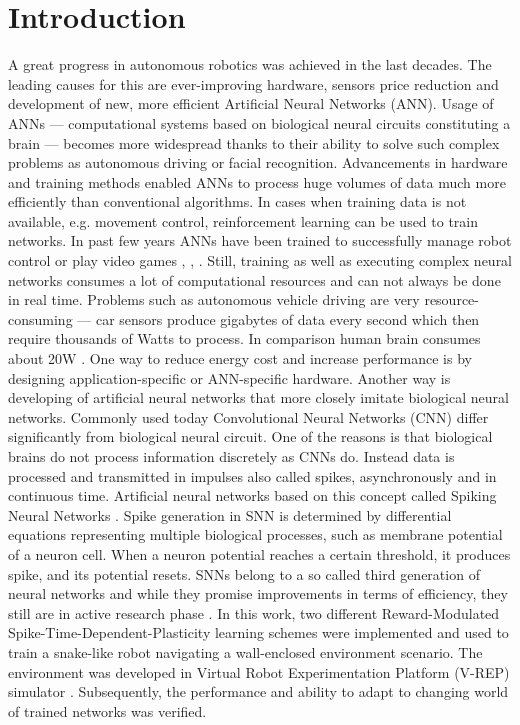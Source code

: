 
\chapter{Introduction}\label{chapter:introduction}

A great progress in autonomous robotics was achieved in the last decades. The leading causes for this are ever-improving hardware, sensors price reduction and development of new, more efficient Artificial Neural Networks (ANN).
Usage of ANNs — computational systems based on biological neural circuits constituting a brain — becomes more widespread thanks to their ability to solve such complex problems as autonomous driving or facial recognition. Advancements in hardware and training methods enabled ANNs to process huge volumes of data much more efficiently than conventional algorithms. In cases when training data is not available, e.g. movement control, reinforcement learning can be used to train networks. In past few years ANNs have been trained to successfully manage robot control or play video games \cite{22}, \cite{23}, \cite{24}.
Still, training as well as executing complex neural networks consumes a lot of computational resources and can not always be done in real time. Problems such as autonomous vehicle driving are very resource-consuming — car sensors produce gigabytes of data every second which then require thousands of Watts to process. In comparison human brain consumes about 20W \cite{25}. One way to reduce energy cost and increase performance is by designing application-specific or ANN-specific hardware. 
Another way is developing of artificial neural networks that more closely imitate biological neural networks. Commonly used today Convolutional Neural Networks (CNN) differ significantly from biological neural circuit. One of the reasons is that biological brains do not process information discretely as CNNs do. Instead data is processed and transmitted in impulses also called spikes, asynchronously and in continuous time. 
Artificial neural networks based on this concept called Spiking Neural Networks \cite{26}. Spike generation in SNN is determined by differential equations representing multiple biological processes, such as membrane potential of a neuron cell. When a neuron potential reaches a certain threshold, it produces spike, and its potential resets. SNNs belong to a so called third generation of neural networks and while they promise improvements in terms of efficiency, they still are in active research phase \cite{27}. 
In this work, two different Reward-Modulated Spike-Time-Dependent-Plasticity learning schemes were implemented and used to train a snake-like robot navigating a wall-enclosed environment scenario. The environment was developed in Virtual Robot
Experimentation Platform (V-REP) simulator \cite{28}. Subsequently, the performance and ability to adapt to changing world of trained networks was verified.
